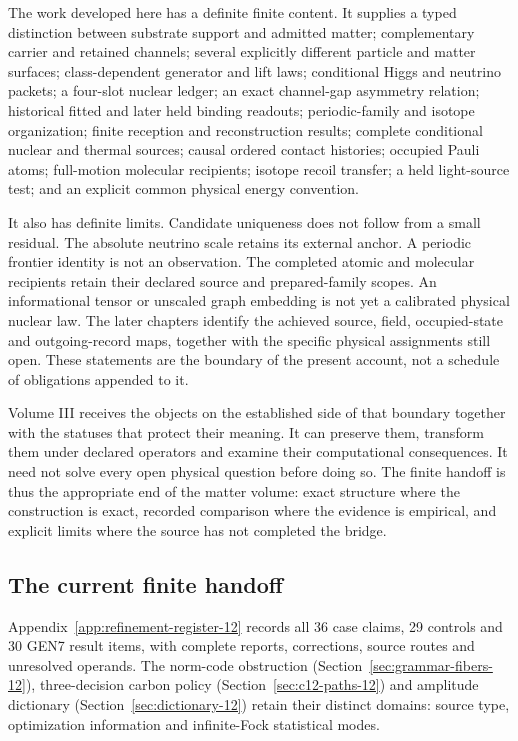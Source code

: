 The work developed here has a definite finite content. It supplies a typed distinction between substrate support and admitted matter; complementary carrier and retained channels; several explicitly different particle and matter surfaces; class-dependent generator and lift laws; conditional Higgs and neutrino packets; a four-slot nuclear ledger; an exact channel-gap asymmetry relation; historical fitted and later held binding readouts; periodic-family and isotope organization; finite reception and reconstruction results; complete conditional nuclear and thermal sources; causal ordered contact histories; occupied Pauli atoms; full-motion molecular recipients; isotope recoil transfer; a held light-source test; and an explicit common physical energy convention.

It also has definite limits. Candidate uniqueness does not follow from a small residual. The absolute neutrino scale retains its external anchor. A periodic frontier identity is not an observation. The completed atomic and molecular recipients retain their declared source and prepared-family scopes. An informational tensor or unscaled graph embedding is not yet a calibrated physical nuclear law. The later chapters identify the achieved source, field, occupied-state and outgoing-record maps, together with the specific physical assignments still open. These statements are the boundary of the present account, not a schedule of obligations appended to it.

Volume III receives the objects on the established side of that boundary together with the statuses that protect their meaning. It can preserve them, transform them under declared operators and examine their computational consequences. It need not solve every open physical question before doing so. The finite handoff is thus the appropriate end of the matter volume: exact structure where the construction is exact, recorded comparison where the evidence is empirical, and explicit limits where the source has not completed the bridge.

\subsection{The current finite handoff}
Appendix~\ref{app:refinement-register-12} records all 36 case claims,
29 controls and 30 GEN7 result items, with complete reports, corrections,
source routes and unresolved operands. The norm-code obstruction
(Section~\ref{sec:grammar-fibers-12}), three-decision carbon policy
(Section~\ref{sec:c12-paths-12}) and amplitude dictionary
(Section~\ref{sec:dictionary-12}) retain their distinct domains:
source type, optimization information and infinite-Fock statistical modes.
